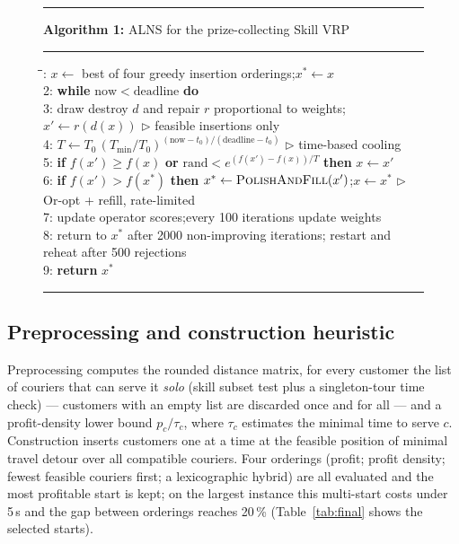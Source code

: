 \documentclass[10pt, a4paper]{article}
\begin{document}
\begin{figure}[t]
\hrule\vspace{3pt}
\noindent\textbf{Algorithm 1:} ALNS for the prize-collecting Skill VRP
\vspace{3pt}\hrule\vspace{4pt}
\small
\begin{tabbing}
\hspace{1.5em}\=\hspace{1.5em}\=\hspace{1.5em}\=:\> $x \gets$ best of four greedy insertion orderings;\quad $x^{*} \gets x$\\
2:\> \textbf{while} $\mathrm{now} < \mathrm{deadline}$ \textbf{do}\\
3:\>\> draw destroy $d$ and repair $r$ proportional to weights;\quad
        $x' \gets r(d(x))$ \hfill$\triangleright$ feasible insertions only\\
4:\>\> $T \gets T_0\,(T_{\min}/T_0)^{(\mathrm{now}-t_0)/(\mathrm{deadline}-t_0)}$
        \hfill$\triangleright$ time-based cooling\\
5:\>\> \textbf{if} $f(x') \ge f(x)$ \textbf{or}
        $\mathrm{rand} < e^{(f(x')-f(x))/T}$ \textbf{then} $x \gets x'$\\
6:\>\> \textbf{if} $f(x') > f(x^{*})$ \textbf{then}
        $x^{*} \gets \textsc{PolishAndFill}(x')$;\quad $x \gets x^{*}$
        \hfill$\triangleright$ Or-opt + refill, rate-limited\\
7:\>\> update operator scores;\quad every 100 iterations update weights\\
8:\>\> return to $x^{*}$ after 2000 non-improving iterations;\quad
        restart and reheat after 500 rejections\\
9:\> \textbf{return} $x^{*}$
\end{tabbing}
\vspace{-6pt}\hrule
\end{figure}

\subsection{Preprocessing and construction heuristic}
Preprocessing computes the rounded distance matrix, for every customer the
list of couriers that can serve it \emph{solo} (skill subset test plus a
singleton-tour time check) --- customers with an empty list are discarded once
and for all --- and a profit-density lower bound $p_c/\tau_c$, where $\tau_c$
estimates the minimal time to serve $c$. Construction inserts customers one
at a time at the feasible position of minimal travel detour over all
compatible couriers. Four orderings (profit; profit density; fewest feasible
couriers first; a lexicographic hybrid) are all evaluated and the most
profitable start is kept; on the largest instance this multi-start costs
under 5\,s and the gap between orderings reaches 20\,\% (Table~\ref{tab:final}
shows the selected starts).
\end{document}
